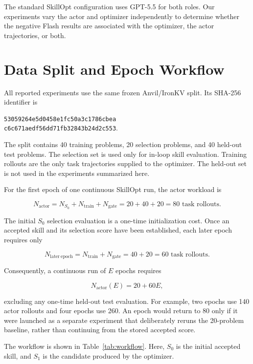 \documentclass[11pt]{article}
\begin{document}
The standard SkillOpt configuration uses GPT-5.5 for both roles. Our
experiments vary the actor and optimizer independently to determine whether
the negative Flash results are associated with the optimizer, the actor
trajectories, or both.

\section{Data Split and Epoch Workflow}

All reported experiments use the same frozen Anvil/IronKV split. Its SHA-256
identifier is
\begin{center}
\small
\texttt{53059264e5d0458e1fc50a3c1786cbea}\\
\texttt{c6c671aedf56dd71fb32843b24d2c553}.
\end{center}
The split contains 40 training problems, 20 selection problems, and 40
held-out test problems. The selection set is used only for in-loop skill
evaluation. Training rollouts are the only task trajectories supplied to the
optimizer. The held-out set is not used in the experiments summarized here.

For the first epoch of one continuous SkillOpt run, the actor workload is

\[
N_{\mathrm{actor}}
= N_{S_0} + N_{\mathrm{train}} + N_{\mathrm{gate}}
= 20 + 40 + 20
= 80 \text{ task rollouts}.
\]

The initial $S_0$ selection evaluation is a one-time initialization cost. Once
an accepted skill and its selection score have been established, each later
epoch requires only

\[
N_{\mathrm{later\ epoch}}
= N_{\mathrm{train}} + N_{\mathrm{gate}}
= 40 + 20
= 60 \text{ task rollouts}.
\]

Consequently, a continuous run of $E$ epochs requires

\[
N_{\mathrm{actor}}(E) = 20 + 60E,
\]

excluding any one-time held-out test evaluation. For example, two epochs use
140 actor rollouts and four epochs use 260. An epoch would return to 80 only
if it were launched as a separate experiment that deliberately reruns the
20-problem baseline, rather than continuing from the stored accepted score.

The workflow is shown in Table~\ref{tab:workflow}. Here, $S_0$ is the initial
accepted skill, and $S_1$ is the candidate produced by the optimizer.
\end{document}
